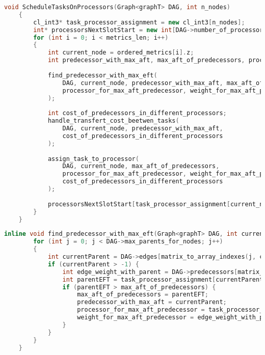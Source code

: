 \begin{lstlisting}[language=C++, caption={Algoritmo di selezione del processore},captionpos=b]
	void ScheduleTasksOnProcessors(Graph<graphT> DAG, int n_nodes)
	{
		cl_int3* task_processor_assignment = new cl_int3[n_nodes];
		int* processorsNextSlotStart = new int[DAG->number_of_processors];
		for (int i = 0; i < metrics_len; i++)
		{
			int current_node = ordered_metrics[i].z; 
			int predecessor_with_max_aft, max_aft_of_predecessors, processor_for_max_aft_predecessor, weight_for_max_aft_predecessor;
			
			find_predecessor_with_max_eft(
				DAG, current_node, predecessor_with_max_aft, max_aft_of_predecessors, 
				processor_for_max_aft_predecessor, weight_for_max_aft_predecessor
			);
			
			int cost_of_predecessors_in_different_processors;
			handle_transfert_cost_beetwen_tasks(
				DAG, current_node, predecessor_with_max_aft, 
				cost_of_predecessors_in_different_processors
			);
			
			assign_task_to_processor(
				DAG, current_node, max_aft_of_predecessors, 
				processor_for_max_aft_predecessor, weight_for_max_aft_predecessor,
				cost_of_predecessors_in_different_processors
			);
			
			processorsNextSlotStart[task_processor_assignment[current_node].x] = task_processor_assignment[current_node].z;
		}
	}
\end{lstlisting}
\begin{lstlisting}[language=C++, caption={Funzione di calcolo del predecessore con EFT massimo},captionpos=b]
	inline void find_predecessor_with_max_eft(Graph<graphT> DAG, int current_node, int predecessor_with_max_aft, int cost_of_predecessors_in_different_processors) {
		for (int j = 0; j < DAG->max_parents_for_nodes; j++)
		{
			int currentParent = DAG->edges[matrix_to_array_indexes(j, current_node, DAG->len)];
			if (currentParent > -1) {
				int edge_weight_with_parent = DAG->predecessors[matrix_to_array_indexes(j, current_node, DAG->len)];
				int parentEFT = task_processor_assignment[currentParent].z + edge_weight_with_parent;
				if (parentEFT > max_aft_of_predecessors) {
					max_aft_of_predecessors = parentEFT;
					predecessor_with_max_aft = currentParent;
					processor_for_max_aft_predecessor = task_processor_assignment[currentParent].x;
					weight_for_max_aft_predecessor = edge_weight_with_parent;
				}
			}
		}
	}
\end{lstlisting}
